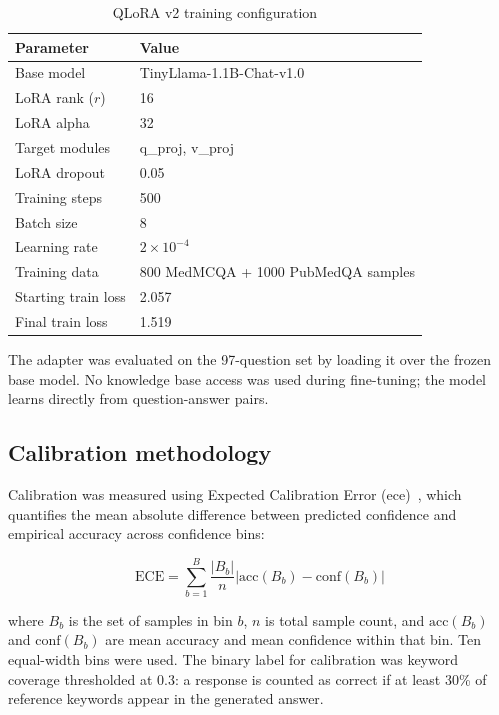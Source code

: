\begin{table}[htbp]
\centering
\caption{QLoRA v2 training configuration}
\label{tab:qlora_config}
\renewcommand{\arraystretch}{1.3}
\begin{tabular}{|l|l|}
\hline
\textbf{Parameter} & \textbf{Value} \\
\hline
Base model & TinyLlama-1.1B-Chat-v1.0 \\
LoRA rank ($r$) & 16 \\
LoRA alpha & 32 \\
Target modules & q\_proj, v\_proj \\
LoRA dropout & 0.05 \\
Training steps & 500 \\
Batch size & 8 \\
Learning rate & $2 \times 10^{-4}$ \\
Training data & 800 MedMCQA + 1000 PubMedQA samples \\
Starting train loss & 2.057 \\
Final train loss & 1.519 \\
\hline
\end{tabular}
\end{table}

The adapter was evaluated on the 97-question set by loading it over the frozen base model. No knowledge base access was used during fine-tuning; the model learns directly from question-answer pairs.

\subsection{Calibration methodology}

Calibration was measured using Expected Calibration Error (\ac{ece})~\cite{naeini2015obtaining}, which quantifies the mean absolute difference between predicted confidence and empirical accuracy across confidence bins:

\begin{equation}
    \text{ECE} = \sum_{b=1}^{B} \frac{|B_b|}{n} \left|\text{acc}(B_b) - \text{conf}(B_b)\right|
\end{equation}

where $B_b$ is the set of samples in bin $b$, $n$ is total sample count, and $\text{acc}(B_b)$ and $\text{conf}(B_b)$ are mean accuracy and mean confidence within that bin. Ten equal-width bins were used. The binary label for calibration was keyword coverage thresholded at 0.3: a response is counted as correct if at least 30\% of reference keywords appear in the generated answer.

